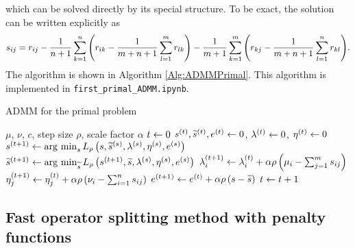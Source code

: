\documentclass[english]{pkupaper}
\begin{document}
which can be solved directly by its special structure. To be exact, the solution can be written explicitly as
\begin{equation}
s_{ i j } = r_{ i j } - \frac{1}{ n + 1 } \sum_{ {k} = {1} }^{n}{\left(  r_{ i k } - \frac{1}{ m + n + 1 } \sum_{ {l} = {1} }^{m}{r_{ l k }}  \right)} - \frac{1}{ m + 1 } \sum_{ {k} = {1} }^{m}{\left(  r_{ k j } - \frac{1}{ m + n + 1 } \sum_{ {l} = {1} }^{n}{r_{ k l }}  \right)}.
\end{equation}
The algorithm is shown in Algorithm \ref{Alg:ADMMPrimal}. This algorithm is implemented in \verb"first_primal_ADMM.ipynb".

\begin{algorithm}
\caption{ADMM for the primal problem}
\label{Alg:ADMMPrimal}
\begin{algorithmic}
\REQUIRE $\mu$, $\nu$, $c$, step size $\rho$, scale factor $\alpha$
\STATE $ t \leftarrow 0 $
\STATE $ s^{\left( t \right)}, \widetilde{s}^{\left( t \right)}, e^{\left( t \right)} \leftarrow 0 $, $ \lambda^{\left( t \right)} \leftarrow 0 $, $ \eta^{\left( t \right)} \leftarrow 0 $
\STATE $ s^{\left(  t + 1  \right)} \leftarrow \operatorname*{\arg\,\min}_s L_{\rho} \left(  s, \widetilde{s}^{\left( s \right)}, \lambda^{\left( s \right)}, \eta^{\left( s \right)}, e^{\left( s \right)}  \right) $
\STATE $ \widetilde{s}^{\left(  t + 1  \right)} \leftarrow \operatorname*{\arg\,\min}_{\widetilde{s}} L_{\rho} \left(  s^{\left(  t + 1  \right)}, \widetilde{s}, \lambda^{\left( s \right)}, \eta^{\left( s \right)}, e^{\left( s \right)}  \right) $
\STATE $ \lambda^{\left(  t + 1  \right)}_i \leftarrow \lambda^{\left( t \right)}_i + \alpha \rho \left(  \mu_i - \sum_{ {j} = {1} }^{m}{s_{ i j }}  \right) $
\STATE $ \eta^{\left(  t + 1  \right)}_j \leftarrow \eta^{\left( t \right)}_j + \alpha \rho \left(  \nu_i - \sum_{ {i} = {1} }^{n}{s_{ i j }}  \right) $
\STATE $ e^{\left(  t + 1  \right)} \leftarrow e^{\left( t \right)} + \alpha \rho \left(  s - \widetilde{s}  \right) $
\STATE $ t \leftarrow t + 1 $
\ENDWHILE
\end{algorithmic}
\end{algorithm}

\subsection{Fast operator splitting method with penalty functions}
\end{document}
